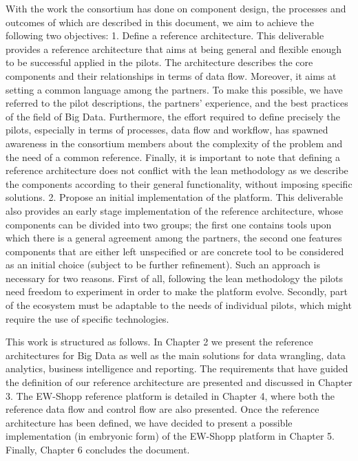 With the work the consortium has done on component design, the processes and outcomes of which are described in this document, we aim to achieve the following two objectives:
1.	Define a reference architecture. This deliverable provides a reference architecture that aims at being general and flexible enough to be successful applied in the pilots. The architecture describes the core components and their relationships in terms of data flow. Moreover, it aims at setting a common language among the partners. To make this possible, we have referred to the pilot descriptions, the partners’ experience, and the best practices of the field of Big Data. Furthermore, the effort required to define precisely the pilots, especially in terms of processes, data flow and workflow, has spawned awareness in the consortium members about the complexity of the problem and the need of a common reference. Finally, it is important to note that defining a reference architecture does not conflict with the lean methodology as we describe the components according to their general functionality, without imposing specific solutions.
2.	Propose an initial implementation of the platform. This deliverable also provides an early stage implementation of the reference architecture, whose components can be divided into two groups; the first one contains tools upon which there is a general agreement among the partners, the second one features components that are either left unspecified or are concrete tool to be considered as an initial choice (subject to be further refinement). Such an approach is necessary for two reasons. First of all, following the lean methodology the pilots need freedom to experiment in order to make the platform evolve. Secondly, part of the ecosystem must be adaptable to the needs of individual pilots, which might require the use of specific technologies.  


This work is structured as follows. In Chapter 2 we present the reference architectures for Big Data as well as the main solutions for data wrangling, data analytics, business intelligence and reporting. The requirements that have guided the definition of our reference architecture are presented and discussed in Chapter 3. The EW-Shopp reference platform is detailed in Chapter 4, where both the reference data flow and control flow are also presented. Once the reference architecture has been defined, we have decided to present a possible implementation (in embryonic form) of the EW-Shopp platform in Chapter 5. Finally, Chapter 6 concludes the document. 


